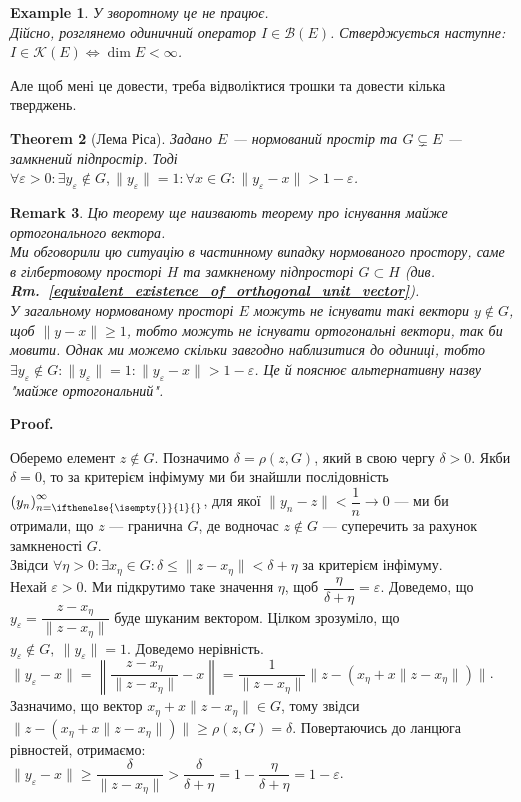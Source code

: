 \documentclass[a4paper, 10pt]{article}
\makeatletter
\theoremstyle{theoremdd}
\newtheorem{theorem}{Theorem}[subsection]
\theoremstyle{theoremdd}
\theoremstyle{theoremdd}
\theoremstyle{theoremdd}
\newtheorem{example}[theorem]{Example}
\theoremstyle{theoremdd}
\theoremstyle{theoremdd}
\newtheorem{remark}[theorem]{Remark}
\theoremstyle{theoremdd}
\theoremstyle{theoremdd}
\newcommand\rmref[1]{\textbf{Rm.~\ref{#1}}}
\newcommand{\sequence}[2][]{\left({#2}\right)_{n=\ifthenelse{\isempty{#1}}{1}{#1}}^{\infty}}
\renewenvironment{proof}[1][Proof.\\]{\par
\pushQED{\hfill \qed}%
\normalfont \topsep6\p@\@plus6\p@\relax
\trivlist
\item\relax
{\bfseries
#1\@addpunct{.}}\hspace\labelsep\ignorespaces
}{%
\popQED\endtrivlist\@endpefalse
}
\makeatother
\begin{document}
\begin{example}
У зворотному це не працює.\\
Дійсно, розглянемо одиничний оператор $I \in \mathcal{B}(E)$. Стверджується наступне:\\
$I \in \mathcal{K}(E) \iff \dim E < \infty$.
\end{example}
\noindent
Але щоб мені це довести, треба відволіктися трошки та довести кілька тверджень.

\begin{theorem}[Лема Ріса]
Задано $E$ --- нормований простір та $G \subsetneq E$ --- замкнений підпростір. Тоді $\forall \varepsilon > 0: \exists y_\varepsilon \notin G, \|y_\varepsilon\| = 1: \forall x \in G: \|y_\varepsilon - x\| > 1-\varepsilon$.
\end{theorem}

\begin{remark}
Цю теорему ще наизвають теорему про існування майже ортогонального вектора.\\
Ми обговорили цю ситуацію в частинному випадку нормованого простору, саме в гілбертовому просторі $H$ та замкненому підпросторі $G \subset H$ (див. \rmref{equivalent_existence_of_orthogonal_unit_vector}).\\
У загальному нормованому просторі $E$ можуть не існувати такі вектори $y \notin G$, щоб $\|y - x\| \geq 1$, тобто можуть не існувати ортогональні вектори, так би мовити. Однак ми можемо скільки завгодно наблизитися до одиниці, тобто $\exists y_\varepsilon \notin G: \|y_\varepsilon\| = 1: \|y_\varepsilon - x\| > 1-\varepsilon$. Це й пояснює альтернативну назву "майже ортогональний".
\end{remark}

\begin{proof}
Оберемо елемент $z \notin G$. Позначимо $\delta = \rho(z,G)$, який в свою чергу $\delta > 0$. Якби $\delta = 0$, то за критерієм інфімуму ми би знайшли послідовність $\sequence{y_n}$, для якої $\|y_n - z \| < \dfrac{1}{n} \to 0$ --- ми би отримали, що $z$ --- гранична $G$, де водночас $z \notin G$ --- суперечить за рахунок замкненості $G$.\\
Звідси $\forall \eta > 0: \exists x_\eta \in G: \delta \leq \|z - x_\eta\| < \delta + \eta$ за критерієм інфімуму.\\
Нехай $\varepsilon > 0$. Ми підкрутимо таке значення $\eta$, щоб $\dfrac{\eta}{\delta + \eta} = \varepsilon$. Доведемо, що $y_\varepsilon = \dfrac{z-x_\eta}{\|z - x_\eta \|}$ буде шуканим вектором. Цілком зрозуміло, що $y_\varepsilon \notin G,\ \|y_\varepsilon\| = 1$. Доведемо нерівність.\\
$\|y_\varepsilon - x\| = \left\| \dfrac{z-x_\eta}{\|z - x_\eta \|} - x \right\| = \dfrac{1}{\|z- x_\eta\|} \| z - (x_\eta + x \|z-x_\eta\|) \|$.\\
Зазначимо, що вектор $x_\eta + x \|z-x_\eta\| \in G$, тому звідси $\|z - (x_\eta + x \|z-x_\eta\|) \| \geq \rho(z,G) = \delta$. Повертаючись до ланцюга рівностей, отримаємо:\\
$\|y_\varepsilon - x\| \geq \dfrac{\delta}{\|z - x_\eta\|} > \dfrac{\delta}{\delta + \eta} = 1 - \dfrac{\eta}{\delta + \eta} = 1- \varepsilon$.
\end{proof}
\end{document}
